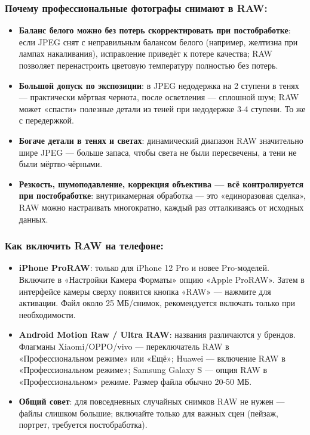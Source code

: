 \subsubsection*{Почему профессиональные фотографы снимают в RAW:}

\begin{itemize}
  \item \textbf{Баланс белого можно без потерь скорректировать при постобработке}: если JPEG снят с неправильным балансом белого (например, желтизна при лампах накаливания), исправление приведёт к потере качества; RAW позволяет перенастроить цветовую температуру полностью без потерь.
  \item \textbf{Большой допуск по экспозиции}: в JPEG недодержка на 2 ступени в тенях — практически мёртвая чернота, после осветления — сплошной шум; RAW может «спасти» полезные детали из теней при недодержке 3-4 ступени. То же с передержкой.
  \item \textbf{Богаче детали в тенях и светах}: динамический диапазон RAW значительно шире JPEG — больше запаса, чтобы света не были пересвечены, а тени не были мёртво-чёрными.
  \item \textbf{Резкость, шумоподавление, коррекция объектива — всё контролируется при постобработке}: внутрикамерная обработка — это «единоразовая сделка», RAW можно настраивать многократно, каждый раз отталкиваясь от исходных данных.
\end{itemize}

\subsubsection*{Как включить RAW на телефоне:}

\begin{itemize}
  \item \textbf{iPhone ProRAW}: только для iPhone 12 Pro и новее Pro-моделей. Включите в «Настройки Камера Форматы» опцию «Apple ProRAW». Затем в интерфейсе камеры сверху появится кнопка «RAW» — нажмите для активации. Файл около 25 МБ/снимок, рекомендуется включать только при необходимости.
  \item \textbf{Android Motion Raw / Ultra RAW}: названия различаются у брендов. Флагманы Xiaomi/OPPO/vivo — переключатель RAW в «Профессиональном режиме» или «Ещё»; Huawei — включение RAW в «Профессиональном режиме»; Samsung Galaxy S — опция RAW в «Профессиональном» режиме. Размер файла обычно 20-50 МБ.
  \item \textbf{Общий совет}: для повседневных случайных снимков RAW не нужен — файлы слишком большие; включайте только для важных сцен (пейзаж, портрет, требуется постобработка).
\end{itemize}

